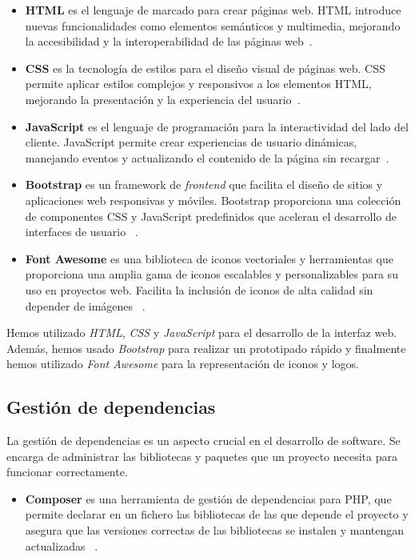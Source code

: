 \begin{itemize}
    \item \textbf{HTML} es el lenguaje de marcado para crear páginas web.
    HTML introduce nuevas funcionalidades como elementos semánticos y multimedia, mejorando la accesibilidad y la
    interoperabilidad de las páginas web~\cite{url_html5}.
    \item \textbf{CSS} es la tecnología de estilos para el diseño visual de páginas web.
    CSS permite aplicar estilos complejos y responsivos a los elementos HTML, mejorando la presentación y la
    experiencia del usuario~\cite{url_css3}.
    \item \textbf{JavaScript} es el lenguaje de programación para la interactividad del lado del cliente.
    JavaScript permite crear experiencias de usuario dinámicas, manejando eventos y actualizando el contenido de la
    página sin recargar~\cite{url_javascript}.
    \item \textbf{Bootstrap} es un framework de \textit{frontend} que facilita el diseño de sitios y aplicaciones web
    responsivas y móviles.
    Bootstrap proporciona una colección de componentes CSS y JavaScript predefinidos que aceleran el desarrollo de
    interfaces de usuario ~\cite{url_bootstrap}.
    \item \textbf{Font Awesome} es una biblioteca de iconos vectoriales y herramientas que proporciona una amplia
    gama de iconos escalables y personalizables para su uso en proyectos web.
    Facilita la inclusión de iconos de alta calidad sin depender de imágenes ~\cite{url_fontawesome}.
\end{itemize}

Hemos utilizado \textit{HTML}, \textit{CSS} y \textit{JavaScript} para el desarrollo de la interfaz web.
Además, hemos usado \textit{Bootstrap} para realizar un prototipado rápido y finalmente hemos utilizado
\textit{Font Awesome} para la representación de iconos y logos.

\subsection{Gestión de dependencias}

La gestión de dependencias es un aspecto crucial en el desarrollo de software.
Se encarga de administrar las bibliotecas y paquetes que un proyecto necesita para funcionar correctamente.

\begin{itemize}
    \item \textbf{Composer}
    es una herramienta de gestión de dependencias para PHP, que permite declarar en un fichero las bibliotecas de las
    que depende el proyecto y asegura que las versiones correctas de las bibliotecas se instalen y mantengan
    actualizadas ~\cite{url_composer}.
\end{itemize}

